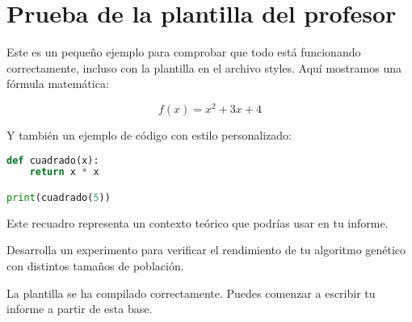\documentclass{article}
\begin{document}
\section*{Prueba de la plantilla del profesor}

Este es un pequeño ejemplo para comprobar que todo está funcionando correctamente, incluso con la plantilla en el archivo styles. Aquí mostramos una fórmula matemática:

\[
  f(x) = x^2 + 3x + 4
\]

Y también un ejemplo de código con estilo personalizado:

\begin{lstlisting}[style=matlabstyle, language=Python, caption={Algoritmo simple}]
def cuadrado(x):
    return x * x

print(cuadrado(5))
\end{lstlisting}

\begin{tcolorbox}[contexto]
  Este recuadro representa un contexto teórico que podrías usar en tu informe.
\end{tcolorbox}

\begin{tcolorbox}[ejercicio]
  Desarrolla un experimento para verificar el rendimiento de tu algoritmo genético con distintos tamaños de población.
\end{tcolorbox}

\begin{tcolorbox}[conclusion]
  La plantilla se ha compilado correctamente. Puedes comenzar a escribir tu informe a partir de esta base.
\end{tcolorbox}
\end{document}
